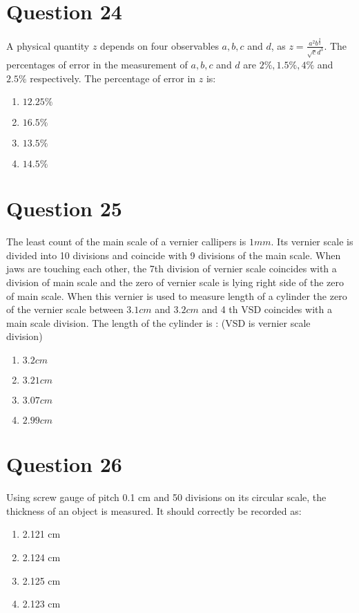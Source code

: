 \documentclass{article}
\begin{document}
\section*{Question 24}
A physical quantity \(z\) depends on four observables \(a, b, c\) and \(d\), as \(z=\frac{a^2 b^{\frac{2}{3}}}{\sqrt{c} d^3}\). The percentages of error in the measurement of \(a, b, c\) and \(d\) are \(2 \%, 1.5 \%, 4 \%\) and \(2.5 \%\) respectively. The percentage of error in \(z\) is: 
\begin{enumerate}[label=(\alph*)]
\item \(12.25 \%\)
\item \(16.5 \%\)
\item \(13.5 \%\)
\item \(14.5 \%\)
\end{enumerate}
\newpage
\section*{Question 25}
The least count of the main scale of a vernier callipers is \(1 mm\). Its vernier scale is divided into 10 divisions and coincide with 9 divisions of the main scale. When jaws are touching each other, the 7th division of vernier scale coincides with a division of main scale and the zero of vernier scale is lying right side of the zero of main scale. When this vernier is used to measure length of a cylinder the zero of the vernier scale between \(3.1 cm\) and \(3.2 cm\) and 4 th VSD coincides with a main scale division. The length of the cylinder is : (VSD is vernier scale division) 
\begin{enumerate}[label=(\alph*)]
\item \(3.2 cm\)
\item \(3.21 cm\)
\item \(3.07 cm\)
\item \(2.99 cm\)
\end{enumerate}
\newpage
\section*{Question 26}
Using screw gauge of pitch 0.1 cm and 50 divisions on its circular scale, the thickness of an object is measured. It should correctly be recorded as: 
\begin{enumerate}[label=(\alph*)]
\item 2.121 cm
\item 2.124 cm
\item 2.125 cm
\item 2.123 cm
\end{enumerate}
\newpage
\end{document}
